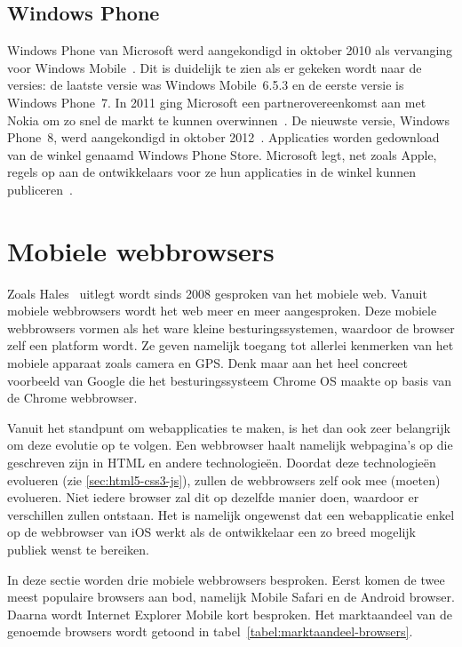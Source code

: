 \subsection{Windows Phone}
Windows Phone van Microsoft werd aangekondigd in oktober 2010 als vervanging voor Windows Mobile~\cite{Seitz2010,Lieberman2010}. 
Dit is duidelijk te zien als er gekeken wordt naar de versies: de laatste versie was Windows Mobile~6.5.3 en de eerste versie is Windows Phone~7. 
In 2011 ging Microsoft een partnerovereenkomst aan met Nokia om zo snel de markt te kunnen overwinnen~\cite{Microsoft2011}. 
De nieuwste versie, Windows Phone~8, werd aangekondigd in oktober 2012~\cite{Reed2012}. 
Applicaties worden gedownload van de winkel genaamd Windows Phone Store.
Microsoft legt, net zoals Apple, regels op aan de ontwikkelaars voor ze hun applicaties in de winkel kunnen publiceren~\cite{Microsoft2013a}.


\section{Mobiele webbrowsers}
\label{sec:mobiele-webbrowsers}
Zoals Hales~\cite{Hales2012} uitlegt wordt sinds 2008 gesproken van het mobiele web. 
Vanuit mobiele webbrowsers wordt het web meer en meer aangesproken. 
Deze mobiele webbrowsers vormen als het ware kleine besturingssystemen, waardoor de browser zelf een platform wordt. 
Ze geven namelijk toegang tot allerlei kenmerken van het mobiele apparaat zoals camera en GPS. 
Denk maar aan het heel concreet voorbeeld van Google die het besturingssysteem Chrome OS maakte op basis van de Chrome webbrowser.

Vanuit het standpunt om webapplicaties te maken, is het dan ook zeer belangrijk om deze evolutie op te volgen. 
Een webbrowser haalt namelijk webpagina's op die geschreven zijn in HTML en andere technologieën. 
Doordat deze technologieën evolueren (zie \ref{sec:html5-css3-js}), zullen de webbrowsers zelf ook mee (moeten) evolueren. 
Niet iedere browser zal dit op dezelfde manier doen, waardoor er verschillen zullen ontstaan. 
Het is namelijk ongewenst dat een webapplicatie enkel op de webbrowser van iOS werkt als de ontwikkelaar een zo breed mogelijk publiek wenst te bereiken. 

In deze sectie worden drie mobiele webbrowsers besproken. 
Eerst komen de twee meest populaire browsers aan bod, namelijk Mobile Safari en de Android browser. 
Daarna wordt Internet Explorer Mobile kort besproken. 
Het marktaandeel van de genoemde browsers wordt getoond in tabel~\ref{tabel:marktaandeel-browsers}.

